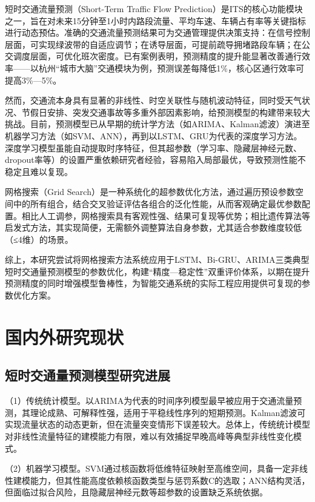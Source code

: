 \documentclass[12pt,a4paper,oneside]{ctexbook}
\begin{document}
	短时交通流量预测（Short-Term Traffic Flow Prediction）是ITS的核心功能模块之一，旨在对未来15分钟至1小时内路段流量、平均车速、车辆占有率等关键指标进行动态预估。准确的交通流量预测结果可为交通管理提供决策支持：在信号控制层面，可实现绿波带的自适应调节；在诱导层面，可提前疏导拥堵路段车辆；在公交调度层面，可优化班次密度。已有案例表明，预测精度的提升能显著改善通行效率——以杭州“城市大脑”交通模块为例，预测误差每降低1\%，核心区通行效率可提高3\%—5\%。
	
	然而，交通流本身具有显著的非线性、时空关联性与随机波动特征，同时受天气状况、节假日安排、突发交通事故等多重外部因素影响，给预测模型的构建带来较大挑战。目前，预测模型已从早期的统计学方法（如ARIMA、Kalman滤波）演进至机器学习方法（如SVM、ANN），再到以LSTM、GRU为代表的深度学习方法。深度学习模型虽能自动提取时序特征，但其超参数（学习率、隐藏层神经元数、dropout率等）的设置严重依赖研究者经验，容易陷入局部最优，导致预测性能不稳定且难以复现。
	
	网格搜索（Grid Search）是一种系统化的超参数优化方法，通过遍历预设参数空间中的所有组合，结合交叉验证评估各组合的泛化性能，从而客观确定最优参数配置。相比人工调参，网格搜索具有客观性强、结果可复现等优势；相比遗传算法等启发式方法，其实现简便，无需额外调整算法自身参数，尤其适合参数维度较低（≤4维）的场景。
	
	综上，本研究尝试将网格搜索方法系统应用于LSTM、Bi-GRU、ARIMA三类典型短时交通量预测模型的参数优化，构建“精度—稳定性”双重评价体系，以期在提升预测精度的同时增强模型鲁棒性，为智能交通系统的实际工程应用提供可复现的参数优化方案。
	
	\section{国内外研究现状}
	
	\subsection{短时交通量预测模型研究进展}
	（1）传统统计模型。以ARIMA为代表的时间序列模型最早被应用于交通流量预测，其理论成熟、可解释性强，适用于平稳线性序列的短期预测\cite{yin2025,zhang2022}。Kalman滤波可实现流量状态的动态更新，但在流量突变情形下误差较大。总体上，传统统计模型对非线性流量特征的建模能力有限，难以有效捕捉早晚高峰等典型非线性变化模式。
	
	（2）机器学习模型。SVM通过核函数将低维特征映射至高维空间，具备一定非线性建模能力，但其性能高度依赖核函数类型与惩罚系数C的选取\cite{sun2015}；ANN结构灵活，但面临过拟合风险，且隐藏层神经元数等超参数的设置缺乏系统依据\cite{yao2023}。
	
\end{document}
